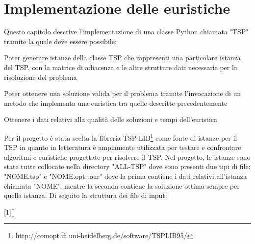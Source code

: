 \documentclass[a4paper,12pt]{report}
\begin{document}
\chapter{Implementazione delle euristiche}
Questo capitolo descrive l'implementazione di una classe Python chiamata "TSP" tramite la quale deve essere possibile:
\begin{legal}
  \item Poter generare istanze della classe TSP che rappresenti una particolare istanza del TSP, con la matrice di adiacenza e le altre strutture dati necessarie per la risoluzione del problema
  \item Poter ottenere una soluzione valida per il problema tramite l'invocazione di un metodo che implementa una euristica tra quelle descritte precedentemente
  \item Ottenere i dati relativi alla qualità delle soluzioni e tempi dell'euristica
\end{legal}
Per il progetto è stata scelta la libreria TSP-LIB\footnote{http://comopt.ifi.uni-heidelberg.de/software/TSPLIB95/} come fonte di istanze per il TSP in quanto in letteratura è ampiamente utilizzata per testare e confrontare algoritmi e euristiche progettate per risolvere il TSP. Nel progetto, le istanze sono state tutte collocate nella directory "ALL-TSP" dove sono presenti due tipi di file: "NOME.tsp" e "NOME.opt.tour" dove la prima contiene i dati relativi all'istanza chiamata "NOME", mentre la seconda contiene la soluzione ottima sempre per quella istanza. Di seguito la struttura dei file di input:

[1][]{%
  \lstset{
    basicstyle=\ttfamily,
    frame=tb,
    #1
  }%
}{}
\end{document}
